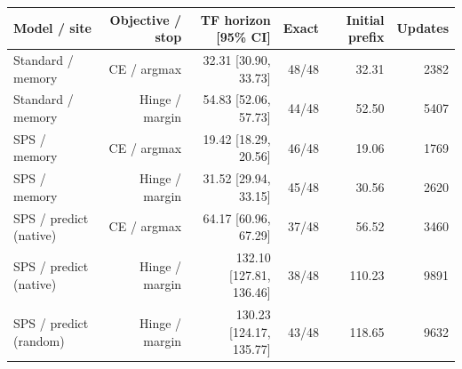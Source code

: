 \begin{tabular}{lrrrrr}
\toprule
Model / site & Objective / stop & TF horizon [95\% CI] & Exact & Initial prefix & Updates \\
\midrule
Standard / memory & CE / argmax & 32.31 [30.90, 33.73] & 48/48 & 32.31 & 2382 \\
Standard / memory & Hinge / margin & 54.83 [52.06, 57.73] & 44/48 & 52.50 & 5407 \\
SPS / memory & CE / argmax & 19.42 [18.29, 20.56] & 46/48 & 19.06 & 1769 \\
SPS / memory & Hinge / margin & 31.52 [29.94, 33.15] & 45/48 & 30.56 & 2620 \\
SPS / predict (native) & CE / argmax & 64.17 [60.96, 67.29] & 37/48 & 56.52 & 3460 \\
SPS / predict (native) & Hinge / margin & 132.10 [127.81, 136.46] & 38/48 & 110.23 & 9891 \\
SPS / predict (random) & Hinge / margin & 130.23 [124.17, 135.77] & 43/48 & 118.65 & 9632 \\
\bottomrule
\end{tabular}
